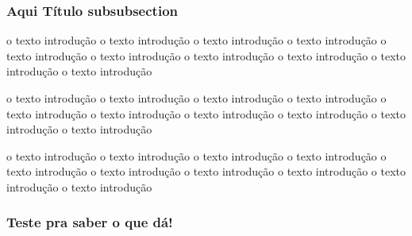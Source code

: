 \documentclass[a4paper, 12pt]{article}
\begin{document}
	  \subsubsection{Aqui Título subsubsection}
	   o texto introdução o texto introdução o texto introdução o texto introdução o texto introdução o texto introdução o texto introdução o texto introdução o texto introdução o texto introdução
	   
	   	   o texto introdução o texto introdução o texto introdução o texto introdução o texto introdução o texto introdução o texto introdução o texto introdução o texto introdução o texto introdução
	   	   
	   	   	   o texto introdução o texto introdução o texto introdução o texto introdução o texto introdução o texto introdução o texto introdução o texto introdução o texto introdução o texto introdução
	   	   	   
\subsubsection{Teste pra saber o que dá!}
 
	   
\end{document}

